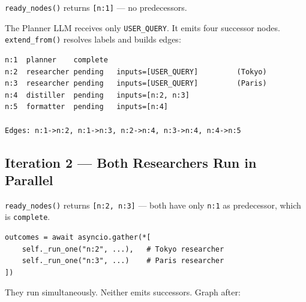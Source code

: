 \documentclass[12pt,a4paper]{article}
\begin{document}
\texttt{ready\_nodes()} returns \texttt{[n:1]} — no predecessors.

The Planner LLM receives only \texttt{USER\_QUERY}. It emits four successor
nodes. \texttt{extend\_from()} resolves labels and builds edges:

\begin{lstlisting}[style=plaincode]
n:1  planner    complete
n:2  researcher pending   inputs=[USER_QUERY]         (Tokyo)
n:3  researcher pending   inputs=[USER_QUERY]         (Paris)
n:4  distiller  pending   inputs=[n:2, n:3]
n:5  formatter  pending   inputs=[n:4]

Edges: n:1->n:2, n:1->n:3, n:2->n:4, n:3->n:4, n:4->n:5
\end{lstlisting}

\begin{center}
\end{center}

\subsection{Iteration 2 — Both Researchers Run in Parallel}

\texttt{ready\_nodes()} returns \texttt{[n:2, n:3]} — both have only \texttt{n:1}
as predecessor, which is \texttt{complete}.

\begin{lstlisting}[style=pycode, caption={Parallel execution — flow.py:251}]
outcomes = await asyncio.gather(*[
    self._run_one("n:2", ...),   # Tokyo researcher
    self._run_one("n:3", ...)    # Paris researcher
])
\end{lstlisting}

They run simultaneously. Neither emits successors. Graph after:
\end{document}
